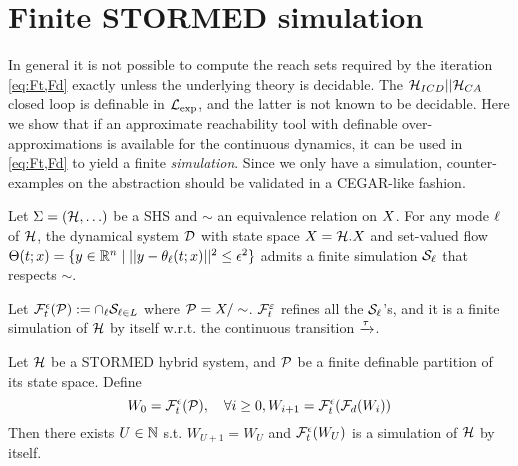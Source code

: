 \section{Finite STORMED simulation}
\label{sec:simulationAprox}
In general it is not possible to compute the reach sets required by the iteration \eqref{eq:Ft,Fd} exactly unless the underlying theory is decidable.
The $\mathcal{H}_{ICD}||\mathcal{H}_{CA}$ closed loop is definable in $\mathcal{L}_{\exp}$, and the latter is not known to be decidable.
Here we show that if an approximate reachability tool with definable over-approximations is available for the continuous dynamics, it can be used in \eqref{eq:Ft,Fd} to yield a finite \emph{simulation}.
Since we only have a simulation, counter-examples on the abstraction should be validated in a CEGAR-like fashion.
\begin{lemma}
	\label{lemma:finite simu}
	Let $\Sigma = (\mathcal{H},\ldots)$ be a SHS and $\sim$ an equivalence relation on $X$.
	For any mode $\ell$ of $\mathcal{H}$, the dynamical system $\mathcal{D}$ with state space $X = \mathcal{H}.X$ and set-valued flow $\Theta(t;x) = \{y \in \mathbb{R}^n \;|\; ||y-\theta_\ell(t;x)||^2 \leq \epsilon^2\}$ admits a finite simulation $\mathcal{S}_\ell$ that respects $\sim$.
\end{lemma}
Let $\mathcal{F}_t^\epsilon(\mathcal{P}) := \cap_{\ell}\mathcal{S}_{\ell \in L}$ where $\mathcal{P} = X/\sim$. $\mathcal{F}_t^\varepsilon$ refines all the $\mathcal{S}_\ell$'s, and it is a finite simulation of $\mathcal{H}$ by itself w.r.t. the continuous transition $\xrightarrow{\tau}$.

\begin{thm}
	\label{thm:finite simulation}
	Let $\mathcal{H}$ be a STORMED hybrid system, 
	and $\mathcal{P}$ be a finite definable partition of its state space.
	Define 
	\begin{equation}
	\label{eq:Fte,Fde}
W_0 = \mathcal{F}_t^\epsilon(\mathcal{P}), \quad \forall i\geq 0, W_{i+1} = \mathcal{F}_t^\epsilon(\mathcal{F}_d(W_i))
	\end{equation}
Then there exists $U \in \mathbb{N}$ s.t. $W_{U+1} = W_U$ and $\mathcal{F}_t^\epsilon(W_U)$ is a simulation of $\mathcal{H}$ by itself.
\end{thm}

